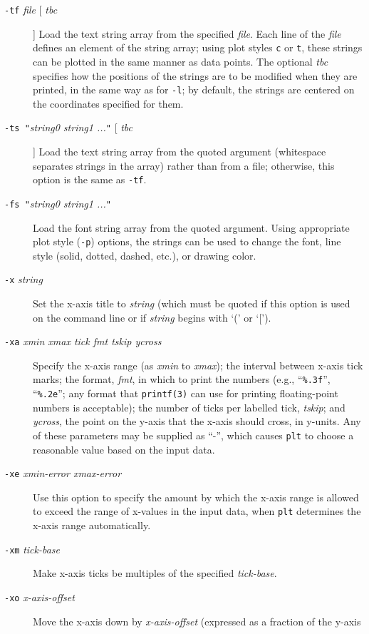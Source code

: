 \begin{description}
\item [\texttt{-tf}\textit{ file} [ \textit{tbc} ] ] Load the text string array
from the specified \textit{file}.  Each line of the \textit{file} defines an element of the
string array;  using plot styles \texttt{c} or \texttt{t}, these strings can be plotted in
the same manner as data points.  The optional \textit{tbc} specifies how the positions
of the strings are to be modified when they are printed, in the same way
as for \texttt{-l};  by default, the strings are centered on the coordinates specified
for them. 
\item [\texttt{-ts "}\textit{string0 string1 ...\texttt{"}} [ \textit{tbc} ] ] Load the text string array from
the quoted argument (whitespace separates strings in the array) rather
than from a file;  otherwise, this option is the same as \texttt{-tf}. 
\item [\texttt{-fs "}\textit{string0
string1 ...\texttt{"}} ] Load the font string array from the quoted argument.  Using appropriate
plot style (\texttt{-p}) options, the strings can be used to change the font, line
style (solid, dotted, dashed, etc.), or drawing color. 
\item [\texttt{-x}\textit{ string} ] Set the x-axis
title to \textit{string} (which must be quoted if this option is used on the command
line or if \textit{string} begins with `(' or `['). 
\item [\texttt{-xa}\textit{ xmin xmax tick fmt tskip ycross}
] Specify the x-axis range (as \textit{xmin} to \textit{xmax}); the interval between x-axis tick
marks; the format, \textit{fmt}, in which to print the numbers (e.g., ``\texttt{\%.3f}'', ``\texttt{\%.2e}'';  any
format that \texttt{\textsf{printf(3)}} can use for printing floating-point numbers is acceptable);
the number of ticks per labelled tick, \textit{tskip}; and \textit{ycross}, the point on
the y-axis that the x-axis should cross, in y-units.  Any of these parameters
may be supplied as ``-'', which causes \texttt{plt} to choose a reasonable value based
on the input data. 
\item [\texttt{-xe}\textit{ xmin-error xmax-error} ] Use this option to specify the
amount by which the x-axis range is allowed to exceed the range of x-values
in the input data, when \texttt{plt} determines the x-axis range automatically. 
\item [\texttt{-xm}\textit{
tick-base} ] Make x-axis ticks be multiples of the specified \textit{tick-base}. 
\item [\texttt{-xo}\textit{ x-axis-offset}
] Move the x-axis down by \textit{x-axis-offset} (expressed as a fraction of the y-axis

\end{description}
